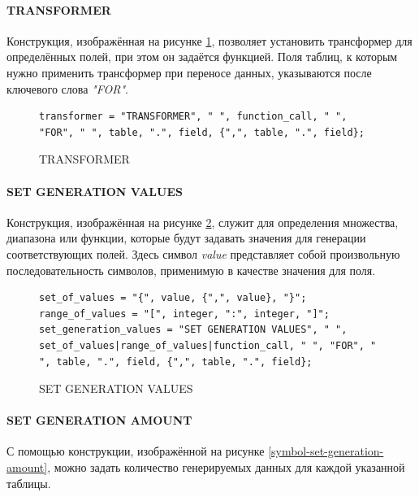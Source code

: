 \paragraph{TRANSFORMER}

Конструкция, изображённая на рисунке \ref{symbol-transformer}, позволяет установить трансформер для определённых полей, при этом он задаётся функцией. Поля таблиц, к которым нужно применить трансформер при переносе данных, указываются после ключевого слова \textit{"FOR"}.

\begin{figure}
  \begin{lstlisting}
transformer = "TRANSFORMER", " ", function_call, " ", "FOR", " ", table, ".", field, {",", table, ".", field};
  \end{lstlisting}
  \caption{TRANSFORMER}
  \label{symbol-transformer}
\end{figure}

\paragraph{SET GENERATION VALUES}

Конструкция, изображённая на рисунке \ref{symbol-set-generation-values}, служит для определения множества, диапазона или функции, которые будут задавать значения для генерации соответствующих полей. Здесь символ \textit{value} представляет собой произвольную последовательность символов, применимую в качестве значения для поля.

\begin{figure}
  \begin{lstlisting}
set_of_values = "{", value, {",", value}, "}";
range_of_values = "[", integer, ":", integer, "]";
set_generation_values = "SET GENERATION VALUES", " ", set_of_values|range_of_values|function_call, " ", "FOR", " ", table, ".", field, {",", table, ".", field};
  \end{lstlisting}
  \caption{SET GENERATION VALUES}
  \label{symbol-set-generation-values}
\end{figure}

\paragraph{SET GENERATION AMOUNT}

С помощью конструкции, изображённой на рисунке \ref{symbol-set-generation-amount}, можно задать количество генерируемых данных для каждой указанной таблицы.

